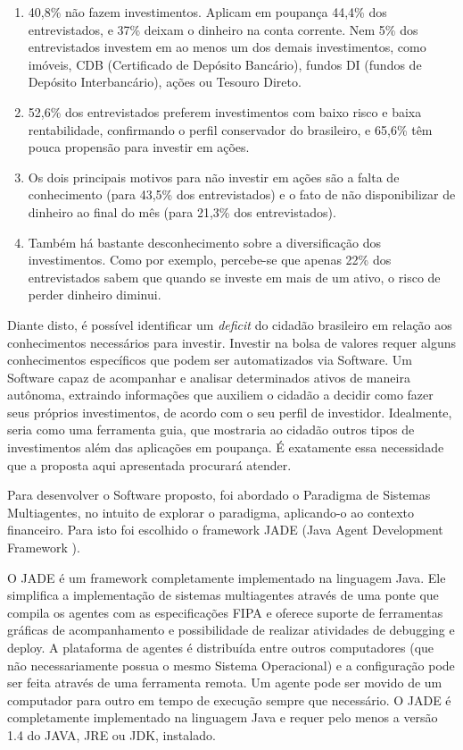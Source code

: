 \begin{citacao}
\begin{enumerate}
\item 40,8\% não fazem investimentos. Aplicam em poupança 44,4\% dos entrevistados, e 37\% deixam o dinheiro na conta corrente. Nem 5\% dos entrevistados investem em ao menos um dos demais investimentos, como imóveis, CDB (Certificado de Depósito Bancário), fundos DI (fundos de Depósito Interbancário), ações ou Tesouro Direto.
\item 52,6\% 	dos entrevistados preferem investimentos com baixo risco e baixa rentabilidade, confirmando o perfil conservador do brasileiro, e 65,6\% têm pouca propensão para investir em ações.
\item Os dois principais motivos para não investir em ações são a falta de conhecimento (para 43,5\% dos entrevistados) e o fato de não disponibilizar de dinheiro ao final do mês (para 21,3\% dos entrevistados).
\item Também há bastante desconhecimento sobre a diversificação dos investimentos. Como por exemplo, percebe-se que apenas 22\% dos entrevistados sabem que quando se investe em mais de um ativo, o risco de perder dinheiro diminui.\cite{isabella2013}

\end{enumerate}
\end{citacao}

Diante disto, é possível identificar um \textit{deficit} do cidadão brasileiro em relação aos conhecimentos necessários para investir. Investir na bolsa de valores requer alguns conhecimentos específicos que podem ser automatizados via Software. Um Software capaz de acompanhar e analisar determinados ativos de maneira autônoma, extraindo informações que auxiliem o cidadão a decidir como fazer seus próprios investimentos, de acordo com o seu perfil de investidor. Idealmente, seria como uma ferramenta guia, que mostraria ao cidadão outros tipos de investimentos além das aplicações em poupança. É exatamente essa necessidade que a proposta aqui apresentada procurará atender.

Para desenvolver o Software proposto, foi abordado o Paradigma de Sistemas Multiagentes, no intuito de explorar o paradigma, aplicando-o ao contexto financeiro. Para isto foi escolhido o framework JADE  (Java Agent Development Framework ).

\begin{citacao}
O JADE é um framework completamente implementado na linguagem Java. Ele simplifica a implementação de sistemas multiagentes através de uma ponte que compila os agentes com as especificações FIPA e oferece suporte de ferramentas gráficas de acompanhamento e possibilidade de realizar atividades de debugging e deploy.  A plataforma de agentes é distribuída entre outros computadores (que não necessariamente possua o mesmo Sistema Operacional) e a configuração pode ser feita através de uma ferramenta remota. Um agente pode ser movido de um computador para outro em tempo de execução sempre que necessário. O JADE é completamente implementado na linguagem Java e requer pelo menos a versão 1.4 do JAVA, JRE ou  JDK, instalado. \cite{telecon2014}
\end{citacao}

